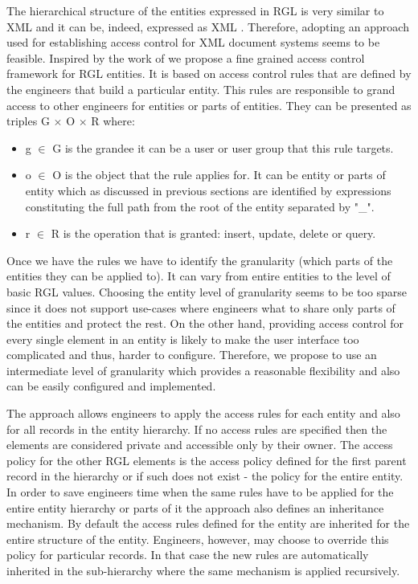 The hierarchical structure of the entities expressed in RGL is very similar to XML and it can be, indeed, expressed as XML \cite{feliksik2011}. Therefore, adopting an approach used for establishing access control for XML document systems seems to be feasible. Inspired by the work of \cite{wu2005access} we propose a fine grained access control framework for RGL entities. It is based on access control rules that are defined by the engineers that build a particular entity. This rules are responsible to grand access to other engineers for entities or parts of entities. They can be presented as triples G $\times$ O $\times$ R where: 
\begin{itemize}
	\item g $\in$ G is the grandee it can be a user or user group that this rule targets.
	\item o $\in$ O is the object that the rule applies for. It can be entity or parts of entity which as discussed in previous sections are identified by expressions constituting the full path from the root of the entity separated by "\_".  
	\item r $\in$ R is the operation that is granted: insert, update, delete or query.
\end{itemize}

Once we have the rules we have to identify the granularity (which parts of the entities they can be applied to). It can vary from entire entities to the level of basic RGL values. Choosing the entity level of granularity seems to be too sparse since it does not support use-cases where engineers what to share only parts of the entities and protect the rest. On the other hand, providing access control for every single element in an entity is likely to make the user interface too complicated and thus, harder to configure. Therefore, we propose to use an intermediate level of granularity which provides a reasonable flexibility and also can be easily configured and implemented. 

The approach allows engineers to apply the access rules for each entity and  also for all records in the entity hierarchy. If no access rules are specified then the elements are considered private and accessible only by their owner. The access policy for the other RGL elements is the access policy defined for the first parent record in the hierarchy or if such does not exist - the policy for the entire entity. In order to save engineers time when the same rules have to be applied for the entire entity hierarchy or parts of it the approach also defines an inheritance mechanism. By default the access rules defined for the entity are inherited for the entire structure of the entity. Engineers, however, may choose to override this policy for particular records. In that case the new rules are automatically inherited in the sub-hierarchy where the same mechanism is applied recursively.


